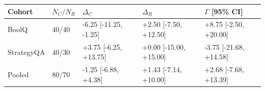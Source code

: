 \begin{tabular}{lllll}
\toprule
Cohort & $N_C/N_R$ & $\Delta_C$ & $\Delta_R$ & $\Gamma$ [95\% CI]\\
\midrule
BoolQ & 40/40 & -6.25 [-11.25, -1.25] & +2.50 [-7.50, +12.50] & +8.75 [-2.50, +20.00]\\
StrategyQA & 40/30 & +3.75 [-6.25, +13.75] & +0.00 [-15.00, +15.00] & -3.75 [-21.68, +14.58]\\
Pooled & 80/70 & -1.25 [-6.88, +4.38] & +1.43 [-7.14, +10.00] & +2.68 [-7.68, +13.39]\\
\bottomrule
\end{tabular}
